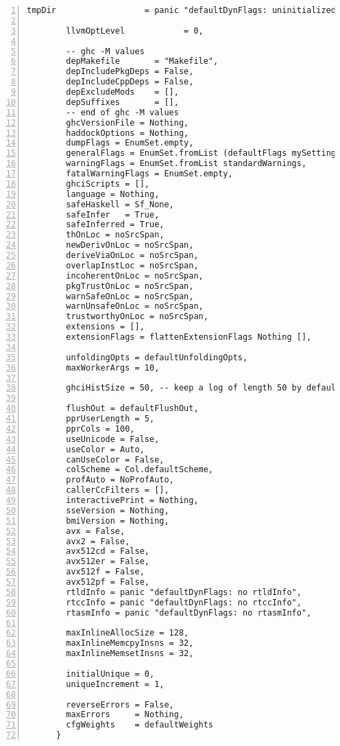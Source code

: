 \documentclass[en]{pracamgr}
\begin{document}
\begin{lstlisting}[numbers=left,stepnumber=1]
        tmpDir                  = panic "defaultDynFlags: uninitialized tmpDir",

        llvmOptLevel            = 0,

        -- ghc -M values
        depMakefile       = "Makefile",
        depIncludePkgDeps = False,
        depIncludeCppDeps = False,
        depExcludeMods    = [],
        depSuffixes       = [],
        -- end of ghc -M values
        ghcVersionFile = Nothing,
        haddockOptions = Nothing,
        dumpFlags = EnumSet.empty,
        generalFlags = EnumSet.fromList (defaultFlags mySettings),
        warningFlags = EnumSet.fromList standardWarnings,
        fatalWarningFlags = EnumSet.empty,
        ghciScripts = [],
        language = Nothing,
        safeHaskell = Sf_None,
        safeInfer   = True,
        safeInferred = True,
        thOnLoc = noSrcSpan,
        newDerivOnLoc = noSrcSpan,
        deriveViaOnLoc = noSrcSpan,
        overlapInstLoc = noSrcSpan,
        incoherentOnLoc = noSrcSpan,
        pkgTrustOnLoc = noSrcSpan,
        warnSafeOnLoc = noSrcSpan,
        warnUnsafeOnLoc = noSrcSpan,
        trustworthyOnLoc = noSrcSpan,
        extensions = [],
        extensionFlags = flattenExtensionFlags Nothing [],

        unfoldingOpts = defaultUnfoldingOpts,
        maxWorkerArgs = 10,

        ghciHistSize = 50, -- keep a log of length 50 by default

        flushOut = defaultFlushOut,
        pprUserLength = 5,
        pprCols = 100,
        useUnicode = False,
        useColor = Auto,
        canUseColor = False,
        colScheme = Col.defaultScheme,
        profAuto = NoProfAuto,
        callerCcFilters = [],
        interactivePrint = Nothing,
        sseVersion = Nothing,
        bmiVersion = Nothing,
        avx = False,
        avx2 = False,
        avx512cd = False,
        avx512er = False,
        avx512f = False,
        avx512pf = False,
        rtldInfo = panic "defaultDynFlags: no rtldInfo",
        rtccInfo = panic "defaultDynFlags: no rtccInfo",
        rtasmInfo = panic "defaultDynFlags: no rtasmInfo",

        maxInlineAllocSize = 128,
        maxInlineMemcpyInsns = 32,
        maxInlineMemsetInsns = 32,

        initialUnique = 0,
        uniqueIncrement = 1,

        reverseErrors = False,
        maxErrors     = Nothing,
        cfgWeights    = defaultWeights
      }
\end{lstlisting}


 
\end{document}
